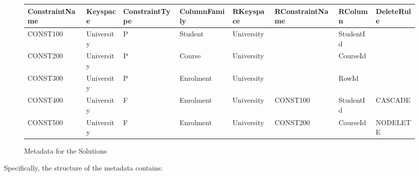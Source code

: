 \begin{figure}[h]
	\centering
	
	\begin{tabular}{CCC CCC CC}
		\toprule
		\bfseries ConstraintName & \bfseries Keyspace & \bfseries ConstraintType &
		\bfseries ColumnFamily & \bfseries RKeyspace & \bfseries RConstraintName &
		\bfseries RColumn & \bfseries DeleteRule\\
		\midrule
		CONST100 & University & P & Student & University & & StudentId &\\
		\rc CONST200 & University & P & Course & University & & CourseId &\\
		CONST300 & University & P & Enrolment & University & & RowId &\\
		\rc CONST400 & University & F & Enrolment & University & CONST100 & StudentId
		& CASCADE\\
		CONST500 & University & F & Enrolment & University & CONST200 & CourseId &
		NODELETE\\
		\bottomrule
	\end{tabular}
	\caption{Metadata for the Solutions}\label{f:metadataInSolutions}
\end{figure}


Specifically, the structure of the metadata contains:

